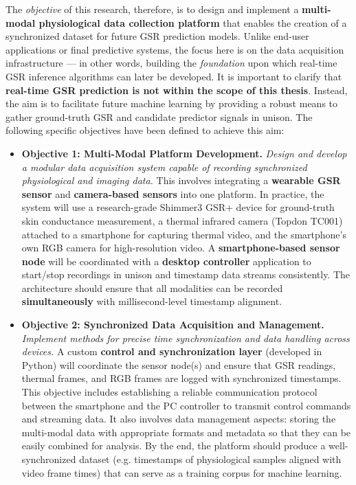The \textit{objective} of this research, therefore, is to design and implement
a \textbf{multi-modal physiological data collection platform} that enables
the creation of a synchronized dataset for future GSR prediction models.
Unlike end-user applications or final predictive systems, the focus here
is on the data acquisition infrastructure --- in other words, building
the \textit{foundation} upon which real-time GSR inference algorithms can later
be developed. It is important to clarify that \textbf{real-time GSR prediction
is not within the scope of this thesis}. Instead, the aim is to
facilitate future machine learning by providing a robust means to gather
ground-truth GSR and candidate predictor signals in unison. The
following specific objectives have been defined to achieve this aim:

\begin{itemize}
\item \textbf{Objective 1: Multi-Modal Platform Development.} \textit{Design and develop
  a modular data acquisition system capable of recording synchronized
  physiological and imaging data.} This involves integrating a
  \textbf{wearable GSR sensor} and \textbf{camera-based sensors} into one
  platform. In practice, the system will use a research-grade Shimmer3
  GSR+ device for ground-truth skin conductance
  measurement\cite{ref15},
  a thermal infrared camera (Topdon TC001) attached to a smartphone for
  capturing thermal
  video\cite{ref15},
  and the smartphone's own RGB camera for high-resolution video. A
  \textbf{smartphone-based sensor node} will be coordinated with a \textbf{desktop
  controller} application to start/stop recordings in unison and
  timestamp data streams consistently. The architecture should ensure
  that all modalities can be recorded \textbf{simultaneously} with
  millisecond-level timestamp alignment.

\item \textbf{Objective 2: Synchronized Data Acquisition and Management.}
  \textit{Implement methods for precise time synchronization and data handling
  across devices.} A custom \textbf{control and synchronization layer}
  (developed in Python) will coordinate the sensor node(s) and ensure
  that GSR readings, thermal frames, and RGB frames are logged with
  synchronized timestamps. This objective includes establishing a
  reliable communication protocol between the smartphone and the PC
  controller to transmit control commands and streaming
  data\cite{ref16}.
  It also involves data management aspects: storing the multi-modal data
  with appropriate formats and metadata so that they can be easily
  combined for analysis. By the end, the platform should produce a
  well-synchronized dataset (e.g. timestamps of physiological samples
  aligned with video frame times) that can serve as a training corpus
  for machine learning.


\end{itemize}
